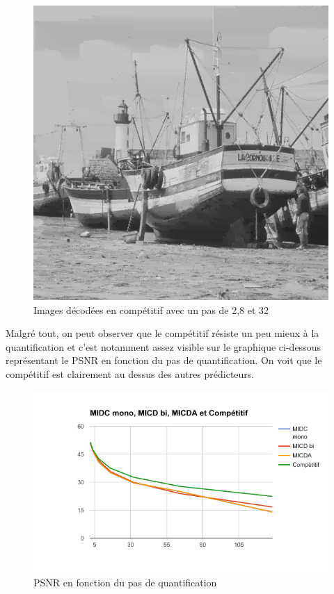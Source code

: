\documentclass[12pt]{report}
\begin{document}
\begin{figure}[H]
\begin{center}
\includegraphics[scale=0.25]{../ImageRes/ImagedecodeeCompetitifQ32.jpg} 
\caption{Images décodées en compétitif avec un pas de 2,8 et 32 }
\end{center}
\end{figure}

Malgré tout, on peut observer que le compétitif résiste un peu mieux à la quantification et c'est notamment assez visible sur le graphique ci-dessous représentant le PSNR en fonction du pas de quantification. On voit que le compétitif est clairement au dessus des autres prédicteurs.

\begin{figure}[H]
\begin{center}
\includegraphics[scale=0.8]{../ImageRes/PSNR.png} 
\caption{PSNR en fonction du pas de quantification}
\end{center}
\end{figure}
\end{document}
